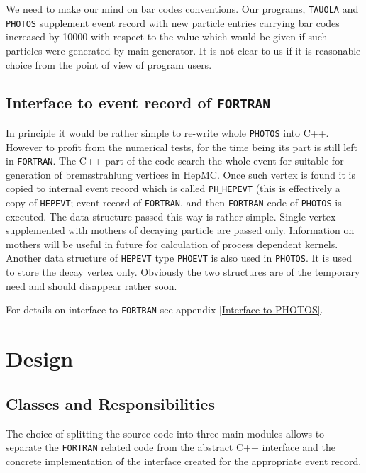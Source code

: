 \documentclass[]{Photos_interface_design}
\begin{document}
We need to make our mind on bar codes conventions. Our programs, {\tt TAUOLA} and
 {\tt PHOTOS} supplement event record with new particle entries carrying bar codes 
increased by 10000 with respect to the value which would be given if such 
particles were generated by main generator. It is not clear to us if it is 
reasonable choice from the point of view of program users.

\subsection{Interface to event record of {\tt FORTRAN}}
In principle it would be rather simple to re-write whole {\tt PHOTOS} into
C++. However to profit from the numerical tests, for the time being its part
is still left in {\tt FORTRAN}. The C++ part of the code search the whole event for
suitable for generation of bremsstrahlung vertices in HepMC. Once such
vertex is found it is copied to internal event record  which is 
called  {\tt PH$\_$HEPEVT} (this is effectively a copy of {\tt HEPEVT};
 event record of {\tt FORTRAN}.
and then {\tt FORTRAN} code of {\tt PHOTOS} is executed.
The data structure passed this way is rather simple. Single vertex
supplemented with mothers of decaying particle are passed only. Information 
on mothers will be useful in future for calculation of process dependent 
kernels. Another data structure of   {\tt HEPEVT} type {\tt PHOEVT} is also 
used in {\tt PHOTOS}. It is used to store the decay vertex only. Obviously 
the two structures are of the temporary need and should disappear rather soon.

For details on interface to {\tt FORTRAN} see appendix \ref{Interface to PHOTOS}.


\section{Design}

\subsection{Classes and Responsibilities}

The choice of splitting the source code into three main modules
allows to separate the {\tt FORTRAN} related code from the abstract C++ interface
and the concrete implementation of the interface created for the appropriate
event record.
\end{document}
